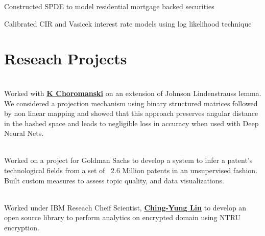 \documentclass[letterpaper]{deedy-resume} %
\begin{document}
\begin{minipage}[t]{0.66\textwidth}
\sectionspace %



\begin{tightitemize}
\item Constructed SPDE to model residential mortgage backed securities
\item Calibrated CIR and Vasicek interest rate models using log likelihood technique 
\end{tightitemize}

\sectionspace %


\section{Reseach Projects}

\\
Worked with \textbf{\href{www.kchoromanski.com}{K Choromanski}} on an extension of Johnson Lindenstrauss lemma. We considered a projection mechanism using binary structured matrices followed by non linear mapping and showed that this approach preserves angular distance in the hashed space and leads to negligible loss in accuracy when used with Deep Neural Nets.

\sectionspace %


\\
Worked on a project for Goldman Sachs to develop a system to infer a patent's technological fields from a set of ~2.6 Million patents in an unsupervised fashion. Built custom measures to assess topic quality, and data visualizations.

\sectionspace %



\\
Worked under IBM Reseach Cheif Scientist, \textbf{\href{http://researcher.watson.ibm.com/researcher/view.php?person=us-chingyung}{Ching-Yung Lin}} to develop an open source library to perform analytics on encrypted domain using NTRU encryption.



\end{minipage}
\end{document}
